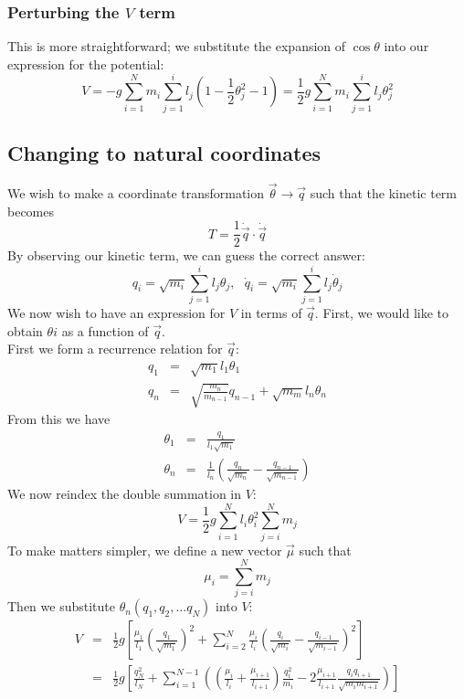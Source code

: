\documentclass[12pt]{article}
\begin{document}
	\subsubsection{Perturbing the $V$ term}
	This is more straightforward; we substitute the expansion of $\cos{\theta}$ into our expression for the potential:
	$$V=-g\sum_{i=1}^N m_i\sum_{j=1}^i l_j\left(1-\frac{1}{2}\theta_j^2-1\right)=\frac{1}{2}g\sum_{i=1}^N m_i\sum_{j=1}^i l_j\theta_j^2$$
	
	\subsection{Changing to natural coordinates}
	We wish to make a coordinate transformation $\vec{\theta}\rightarrow\vec{q}$ such that the kinetic term becomes
	$$T=\frac{1}{2}\dot{\vec{q}}\cdot\dot{\vec{q}}$$
	By observing our kinetic term, we can guess the correct answer:
	$$q_i = \sqrt{m_i}\sum_{j=1}^il_j\theta_j,\mbox{ }\dot{q}_i = \sqrt{m_i}\sum_{j=1}^il_j\dot{\theta}_j$$
	We now wish to have an expression for $V$ in terms of $\vec{q}$. First, we would like to obtain $\theta{i}$ as a function of $\vec{q}$.\\
	First we form a recurrence relation for $\vec{q}$:
	\begin{eqnarray*}
	q_1 &=& \sqrt{m_1}l_1\theta_1\\
	q_n &=& \sqrt{\frac{m_n}{m_{n-1}}}q_{n-1} + \sqrt{m_m}l_n\theta_n
	\end{eqnarray*}
	From this we have
	\begin{eqnarray*}
	\theta_1 &=& \frac{q_1}{l_1\sqrt{m_1}}\\
	\theta_n &=& \frac{1}{l_n}\left(\frac{q_n}{\sqrt{m_n}}-\frac{q_{n-1}}{\sqrt{m_{n-1}}}\right)
	\end{eqnarray*}
	We now reindex the double summation in $V$:
	$$V=\frac{1}{2}g\sum_{i=1}^Nl_i\theta_i^2\sum_{j=i}^Nm_j$$
	To make matters simpler, we define a new vector $\vec{\mu}$ such that
	$$\mu_i=\sum_{j=i}^Nm_j$$
	Then we substitute $\theta_n(q_1, q_2,\dots q_N)$ into $V$:
	\begin{eqnarray*}		
	V&=&\frac{1}{2}g\left[\frac{\mu_1}{l_1}\left(\frac{q_1}{\sqrt{m_1}}\right)^2+\sum_{i=2}^N\frac{\mu_i}{l_i}\left(\frac{q_i}{\sqrt{m_i}}-\frac{q_{i-1}}{\sqrt{m_{i-1}}}\right)^2\right]\\
	&=&\frac{1}{2}g\left[\frac{q_N^2}{l_N}+\sum_{i=1}^{N-1}\left(\left(\frac{\mu_i}{l_i}+\frac{\mu_{i+1}}{l_{i+1}}\right)\frac{q_i^2}{m_i}-2\frac{\mu_{i+1}}{l_{i+1}}\frac{q_iq_{i+1}}{\sqrt{m_im_{i+1}}}\right)\right]
	\end{eqnarray*}
	
\end{document}
